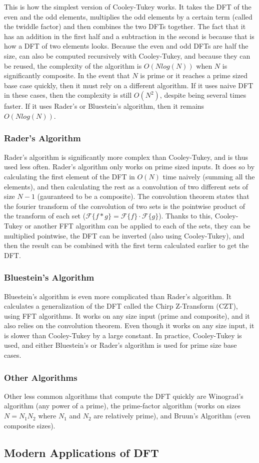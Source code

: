 This is how the simplest version of Cooley-Tukey works. It takes the DFT of the even and the odd elements, multiplies the odd elements by a certain term (called the twiddle factor) and then combines the two DFTs together. The fact that it has an addition in the first half and a subtraction in the second is because that is how a DFT of two elements looks. Because the even and odd DFTs are half the size, can also be computed recursively with Cooley-Tukey, and because they can be reused, the complexity of the algorithm is $O(Nlog(N))$ when $N$ is significantly composite. In the event that $N$ is prime or it reaches a prime sized base case quickly, then it must rely on a different algorithm. If it uses naive DFT in these cases, then the complexity is still $O(N^2)$, despite being several times faster. If it uses Rader's or Bluestein's algorithm, then it remains $O(Nlog(N))$.
\subsubsection{Rader's Algorithm}
Rader's algorithm is significantly more complex than Cooley-Tukey, and is thus used less often. Rader's algorithm only works on prime sized inputs. It does so by calculating the first element of the DFT in $O(N)$ time naively (summing all the elements), and then calculating the rest as a convolution of two different sets of size $N-1$ (gauranteed to be a composite). The convolution theorem states that the fourier transform of the convolution of two sets is the pointwise product of the transform of each set ($\mathcal{F}\{f*g\}=\mathcal{F}\{f\}\cdot\mathcal{F}\{g\}$). Thanks to this, Cooley-Tukey or another FFT algorithm can be applied to each of the sets, they can be multiplied pointwise, the DFT can be inverted (also using Cooley-Tukey), and then the result can be combined with the first term calculated earlier to get the DFT.
\subsubsection{Bluestein's Algorithm}
Bluestein's algorithm is even more complicated than Rader's algorithm. It calculates a generalization of the DFT called the Chirp Z-Transform (CZT), using FFT algorithms. It works on any size input (prime and composite), and it also relies on the convolution theorem. Even though it works on any size input, it is slower than Cooley-Tukey by a large constant. In practice, Cooley-Tukey is used, and either Bluestein's or Rader's algorithm is used for prime size base cases.
\subsubsection{Other Algorithms}
Other less common algorithms that compute the DFT quickly are Winograd's algorithm (any power of a prime), the prime-factor algorithm (works on sizes $N=N_1N_2$ where $N_1$ and $N_2$ are relatively prime), and Bruun's Algorithm (even composite sizes).
\subsection{Modern Applications of DFT}
